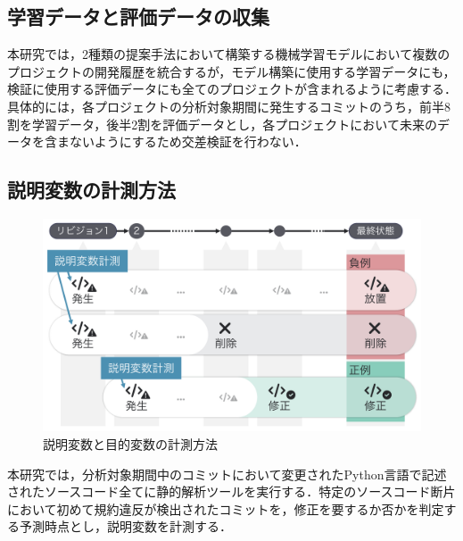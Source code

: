 \documentclass[T,J]{fose} %
\begin{document}
\subsection{学習データと評価データの収集}

本研究では，2種類の提案手法において構築する機械学習モデルにおいて複数のプロジェクトの開発履歴を統合するが，モデル構築に使用する学習データにも，検証に使用する評価データにも全てのプロジェクトが含まれるように考慮する．具体的には，各プロジェクトの分析対象期間に発生するコミットのうち，前半8割を学習データ，後半2割を評価データとし，各プロジェクトにおいて未来のデータを含まないようにするため交差検証を行わない．



\subsection{説明変数の計測方法}

\begin{figure}[t]
	\centering
	\includegraphics[width=1.0\linewidth]{Kameoka_fig/kameoka_fig2.pdf}
	\caption{説明変数と目的変数の計測方法}
	\label{fig:mokutekihensu}
\end{figure}

本研究では，分析対象期間中のコミットにおいて変更されたPython言語で記述されたソースコード全てに静的解析ツールを実行する．特定のソースコード断片において初めて規約違反が検出されたコミットを，修正を要するか否かを判定する予測時点とし，説明変数を計測する．
\end{document}
